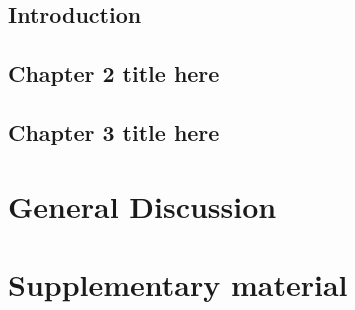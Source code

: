 \documentclass[12pt,twoside]{memoir}
\begin{document}
	\begin{refsection}
		\chapter{Introduction} \label{intro}
		\thispagestyle{empty}
		\newpage
		
	\end{refsection}
	
	\begin{refsection}
		\chapter[Contents title here][Running header title here]{Chapter 2 title here} \label{ch2}
		\thispagestyle{empty}
		\newpage
		
	\end{refsection}
	
	\begin{refsection}
		\SingleSpacing
		\chapter[Contents title here][Running header title here]{Chapter 3 title here} \label{ch3}
		\vspace{25mm}
		\thispagestyle{empty}
		\newpage
		\OnehalfSpacing
		
	\end{refsection}
	
	\chapter[Contents title here][Running header title here]{General Discussion} \label{disc}
	\thispagestyle{empty}
	\newpage
	\OnehalfSpacing
	
	
	\appendix
	\chapter[Contents title here][Running header title here]{Supplementary material} \label{supp}
	\thispagestyle{empty}
	\newpage
	\thispagestyle{empty}
	\cleartooddpage
	
	
\end{document}

